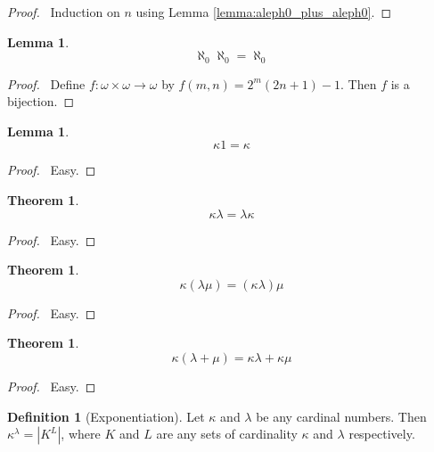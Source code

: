 \documentclass{report}
\let\qed\relax
\newtheorem{lemma}[axiom]{Lemma}
\newtheorem{theorem}[axiom]{Theorem}
\theoremstyle{definition}
\newtheorem{definition}[axiom]{Definition}
\begin{document}
    \begin{proof}
        \pf\ Induction on $n$ using Lemma \ref{lemma:aleph0_plus_aleph0}. \qed
    \end{proof}

    \begin{lemma}
        \[ \aleph_0 \aleph_0 = \aleph_0 \]
    \end{lemma}

    \begin{proof}
        \pf\ Define $f : \omega \times \omega \rightarrow \omega$ by $f(m,n) = 2^m(2n+1)-1$. Then $f$
        is a bijection. \qed
    \end{proof}

    \begin{lemma}
        \[ \kappa 1 = \kappa \]
    \end{lemma}

    \begin{proof}
        \pf\ Easy. \qed
    \end{proof}

    \begin{theorem}
        \[ \kappa \lambda = \lambda \kappa \]
    \end{theorem}

    \begin{proof}
        \pf\ Easy. \qed
    \end{proof}

    \begin{theorem}
        \[ \kappa (\lambda \mu) = (\kappa \lambda) \mu \]
    \end{theorem}

    \begin{proof}
        \pf\ Easy. \qed
    \end{proof}

    \begin{theorem}
        \[ \kappa (\lambda + \mu) = \kappa \lambda + \kappa \mu \]
    \end{theorem}

    \begin{proof}
        \pf\ Easy. \qed
    \end{proof}

    \begin{definition}[Exponentiation]
        Let $\kappa$ and $\lambda$ be any cardinal numbers. Then $\kappa^\lambda = |K^L|$,
        where $K$ and $L$ are any sets of cardinality $\kappa$ and $\lambda$ respectively.
    \end{definition}
\end{document}
